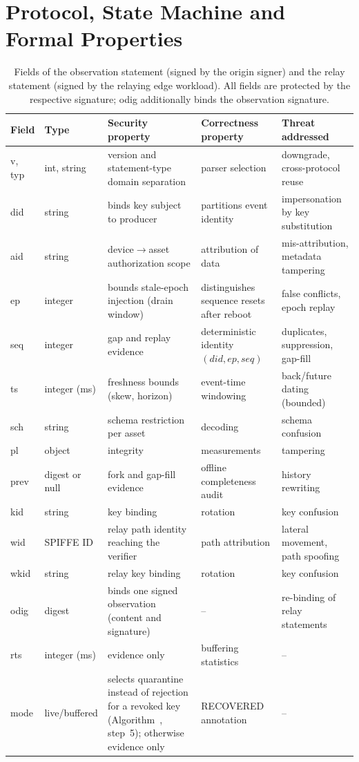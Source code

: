 \documentclass[10pt,a4paper]{article}
\makeatletter
\newcommand{\Mref}[1]{\@ifundefined{mainref@#1}{\textbf{??}\PackageWarning{mainxref}{Undefined article label #1}}{\@nameuse{mainref@#1}}}
\makeatother
\begin{document}
\section{Protocol, State Machine and Formal Properties}\label{sec:S-protocol}
\begin{table}[!htbp]
\caption{Fields of the observation statement (signed by the origin signer) and the relay statement (signed by the relaying edge workload). All fields are protected by the respective signature; \textsf{odig} additionally binds the observation signature.\label{tab:S-fields}}
\footnotesize
\begin{tabularx}{\linewidth}{llXXl}
\toprule
Field & Type & Security property & Correctness property & Threat addressed\\
\midrule
\textsf{v}, \textsf{typ} & int, string & version and statement-type domain separation & parser selection & downgrade, cross-protocol reuse\\
\textsf{did} & string & binds key subject to producer & partitions event identity & impersonation by key substitution\\
\textsf{aid} & string & device$\rightarrow$asset authorization scope & attribution of data & mis-attribution, metadata tampering\\
\textsf{ep} & integer & bounds stale-epoch injection (drain window) & distinguishes sequence resets after reboot & false conflicts, epoch replay\\
\textsf{seq} & integer & gap and replay evidence & deterministic identity $(did,ep,seq)$ & duplicates, suppression, gap-fill\\
\textsf{ts} & integer (ms) & freshness bounds (skew, horizon) & event-time windowing & back/future dating (bounded)\\
\textsf{sch} & string & schema restriction per asset & decoding & schema confusion\\
\textsf{pl} & object & integrity & measurements & tampering\\
\textsf{prev} & digest or null & fork and gap-fill evidence & offline completeness audit & history rewriting\\
\textsf{kid} & string & key binding & rotation & key confusion\\
\midrule
\textsf{wid} & SPIFFE ID & relay path identity reaching the verifier & path attribution & lateral movement, path spoofing\\
\textsf{wkid} & string & relay key binding & rotation & key confusion\\
\textsf{odig} & digest & binds one signed observation (content and signature) & -- & re-binding of relay statements\\
\textsf{rts} & integer (ms) & evidence only & buffering statistics & --\\
\textsf{mode} & live/buffered & selects quarantine instead of rejection for a revoked key (Algorithm~\Mref{alg:admit}, step~5); otherwise evidence only & RECOVERED annotation & --\\
\bottomrule
\end{tabularx}
\end{table}
\end{document}
